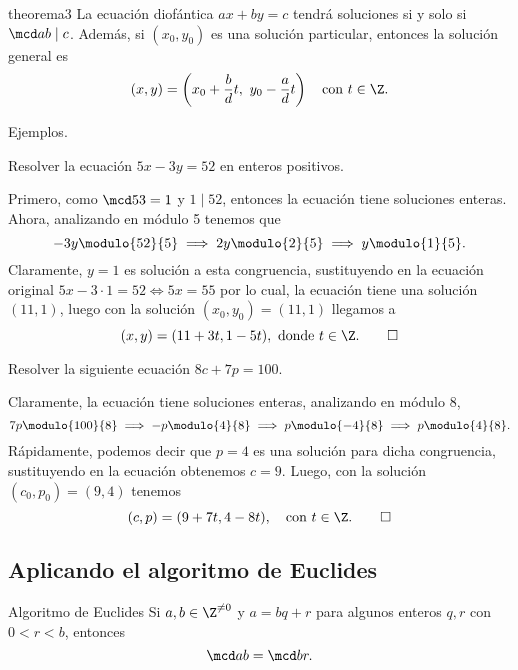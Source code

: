 \begin{theorem.box}{}{theorema3}
    La ecuación diofántica $ax + by = c$ tendrá soluciones si y solo si $\mcd a b \mid c$.
    Además, si $(x_0,y_0)$ es una solución particular, entonces la solución general es
    \[
        (x,y) = \left(x_0+\frac{b}{d}t,\ y_0 -\frac{a}{d}t\right) \quad \text{con}\ t \in \Z.
    \]
\end{theorem.box}

Ejemplos.
\begin{example}
    Resolver la ecuación $5x - 3y = 52$ en enteros positivos.
\end{example}
\begin{solution}
    Primero, como $\mcd 5 3 = 1$ y $1 \mid 52$, entonces la ecuación tiene soluciones enteras.
    Ahora, analizando en módulo 5 tenemos que
    \[
        - 3y \modulo{52}{5} \implies 2y \modulo{2}{5} \implies y \modulo{1}{5}.
    \]
    Claramente, $y = 1$ es solución a esta congruencia, sustituyendo en la ecuación original $5x - 3\cdot 1 = 52 \iff 5x = 55$
    por lo cual, la ecuación tiene una solución $(11, 1)$, luego con la solución $(x_0,y_0)=(11,1)$ llegamos a
    \[
        (x,y) = (11+3t,1-5t), \mbox{ donde } t\in \Z.\qedhere
    \]
\end{solution}

\begin{example}
    Resolver la siguiente ecuación $8c+7p=100$.
\end{example}
\begin{solution}
    Claramente, la ecuación tiene soluciones enteras, analizando en módulo 8,
    \[
        7p \modulo{100}{8} \implies -p \modulo{4}{8} \implies p \modulo{-4}{8} \implies p \modulo{4}{8}.
    \]
    Rápidamente, podemos decir que $p = 4$ es una solución para dicha congruencia, sustituyendo en la ecuación obtenemos $c = 9$.
    Luego, con la solución $(c_0, p_0) = (9, 4)$ tenemos
    \[
        (c,p) = (9 + 7t, 4 - 8t),\quad \text{con}\ t\in \Z.\qedhere
    \]
\end{solution}



\subsection{Aplicando el algoritmo de Euclides}

\begin{definition.box}{Algoritmo de Euclides}{}
    Si $a, b \in \Z^{\neq 0}$ y $a = bq + r$ para algunos enteros $q,r$ con $0 < r < b$, entonces
    \[
        \mcd a b = \mcd b r.
    \]
\end{definition.box}

